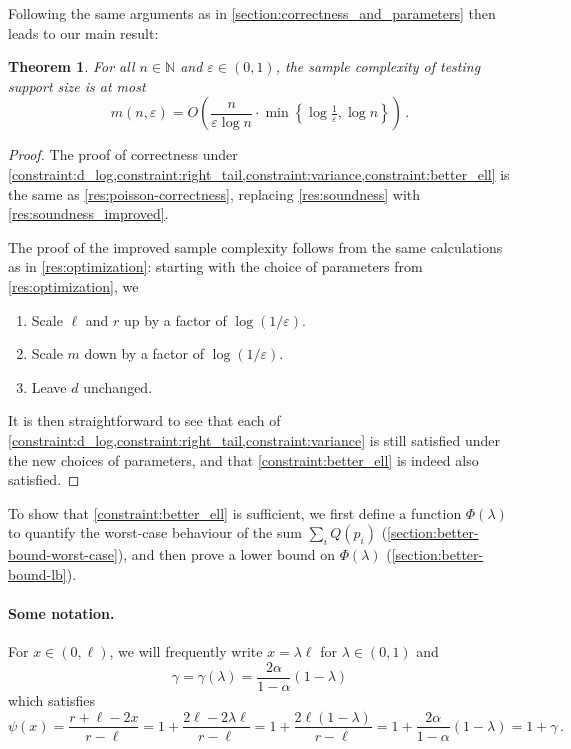 \documentclass[10pt,a4paper]{article}
\newtheorem{theorem}{Theorem}[section]
\newcommand{\bN}{\ensuremath{\mathbb{N}}}
\renewcommand{\epsilon}{\varepsilon}
\begin{document}
Following the same arguments as in \cref{section:correctness_and_parameters} then leads to our main
result:
\begin{theorem}
\label{thm:formal-main}
For all $n \in \bN$ and $\epsilon \in (0,1)$, the sample complexity of testing support size is
at most
\[
  m(n,\epsilon) = O\left(\frac{n}{\epsilon \log n} \cdot \min\left\{ \log\tfrac{1}{\epsilon}, \log
n\right\} \right) \,.
\]
\end{theorem}
\begin{proof}
    The proof of correctness under
    \cref{constraint:d_log,constraint:right_tail,constraint:variance,constraint:better_ell} is the
    same as \cref{res:poisson-correctness}, replacing \cref{res:soundness} with
    \cref{res:soundness_improved}.

    The proof of the improved sample complexity follows from the same calculations as in
    \cref{res:optimization}: starting with the choice of parameters from \cref{res:optimization}, we
    \begin{enumerate}
        \item Scale $\ell$ and $r$ up by a factor of $\log(1/\epsilon)$.
        \item Scale $m$ down by a factor of $\log(1/\epsilon)$.
        \item Leave $d$ unchanged.
    \end{enumerate}
    It is then straightforward to see that each of
    \cref{constraint:d_log,constraint:right_tail,constraint:variance} is still satisfied under the
    new choices of parameters, and that \cref{constraint:better_ell} is indeed also satisfied.
\end{proof}


To show that \cref{constraint:better_ell} is sufficient, we first define a function $\Phi(\lambda)$
to quantify the worst-case behaviour of the sum $\sum_i Q(p_i)$
(\cref{section:better-bound-worst-case}), and then prove a lower bound on $\Phi(\lambda)$
(\cref{section:better-bound-lb}).

\paragraph*{Some notation.}
For $x \in (0,\ell)$, we will frequently write $x = \lambda \ell$
for $\lambda \in (0,1)$ and
\[
  \gamma = \gamma(\lambda) = \frac{2\alpha}{1-\alpha}(1-\lambda)
\]
which satisfies
\begin{equation}
\label{eq:psi-gamma}
  \psi(x) = \frac{r+\ell-2x}{r-\ell} = 1 + \frac{2\ell-2\lambda\ell}{r-\ell} = 1 +
\frac{2\ell(1-\lambda)}{r-\ell} = 1 + \frac{2\alpha}{1-\alpha}(1-\lambda) = 1 + \gamma \,.
\end{equation}
\end{document}
